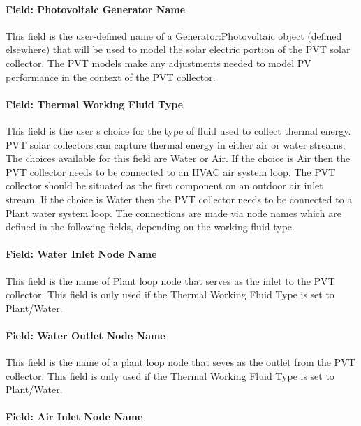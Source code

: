\paragraph{Field: Photovoltaic Generator Name}\label{field-photovoltaic-generator-name}

This field is the user-defined name of a \hyperref[generatorphotovoltaic-000]{Generator:Photovoltaic} object (defined elsewhere) that will be used to model the solar electric portion of the PVT solar collector. The PVT models make any adjustments needed to model PV performance in the context of the PVT collector.

\paragraph{Field: Thermal Working Fluid Type}\label{field-thermal-working-fluid-type}

This field is the user s choice for the type of fluid used to collect thermal energy. PVT solar collectors can capture thermal energy in either air or water streams. The choices available for this field are Water or Air. If the choice is Air then the PVT collector needs to be connected to an HVAC air system loop. The PVT collector should be situated as the first component on an outdoor air inlet stream. If the choice is Water then the PVT collector needs to be connected to a Plant water system loop. The connections are made via node names which are defined in the following fields, depending on the working fluid type.

\paragraph{Field: Water Inlet Node Name}\label{field-water-inlet-node-name-003}

This field is the name of Plant loop node that serves as the inlet to the PVT collector. This field is only used if the Thermal Working Fluid Type is set to Plant/Water.

\paragraph{Field: Water Outlet Node Name}\label{field-water-outlet-node-name-002}

This field is the name of a plant loop node that seves as the outlet from the PVT collector. This field is only used if the Thermal Working Fluid Type is set to Plant/Water.

\paragraph{Field: Air Inlet Node Name}\label{field-air-inlet-node-name-006}

